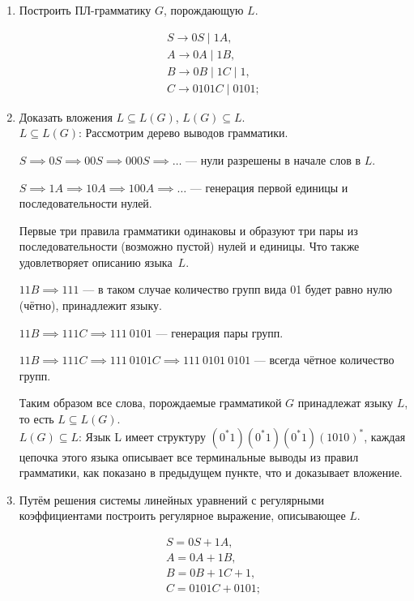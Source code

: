 \documentclass[fleqn,12pt, a4paper]{article}
\begin{document}
\begin{enumerate}[label=(\roman{*})]
	\item Построить ПЛ-грамматику $G$, порождающую $L$.
	
	\begin{equation}
		\begin{array}{l}
			S \to 0S \mid 1A, \\
			A \to 0A \mid 1B, \\
			B \to 0B \mid 1C \mid 1, \\
			C \to 0101C \mid 0101;
		\end{array}
	\end{equation}
	
	\item Доказать вложения $L \subseteq L(G)$, $L(G) \subseteq L$.\\
	
	\underline{$L \subseteq L(G)$}: Рассмотрим дерево выводов грамматики.
	
	$S \implies 0S \implies 00S \implies 000S \implies \dots$ --- нули разрешены в начале слов в $L$.
	
	$S \implies 1A \implies 10A \implies 100A \implies \dots$ --- генерация первой единицы и последовательности нулей.
	
	Первые три правила грамматики одинаковы и образуют три пары из последовательности (возможно пустой) нулей и единицы. Что также удовлетворяет описанию языка~$L$.
	
	$11B \implies 111 $ --- в таком случае количество групп вида 01 будет равно нулю (чётно), принадлежит языку.
	
	$11B \implies 111C \implies 111\ 0101$ --- генерация пары групп.
	
	$11B \implies 111C \implies 111\ 0101C \implies 111\ 0101\ 0101$ --- всегда чётное количество групп.
	
	Таким образом все слова, порождаемые грамматикой $G$ принадлежат языку $L$, то есть $L \subseteq L(G)$.\\
	
	
	\underline{$L(G) \subseteq L$}: Язык L имеет структуру $(0^*1)(0^*1)(0^*1)(1010)^*$, каждая цепочка этого языка описывает все терминальные выводы из правил
	 грамматики, как показано в предыдущем пункте, что и доказывает вложение. 
	
	\item Путём решения системы линейных уравнений с регулярными коэффициентами построить регулярное выражение, описывающее $L$.
	
	
	\begin{equation}
		\begin{array}{l}
		S = 0S + 1A, \\
		A = 0A + 1B, \\
		B = 0B + 1C + 1, \\
		C = 0101C + 0101; \\\\
		

\end{array}
\end{equation}
\end{enumerate}
\end{document}
